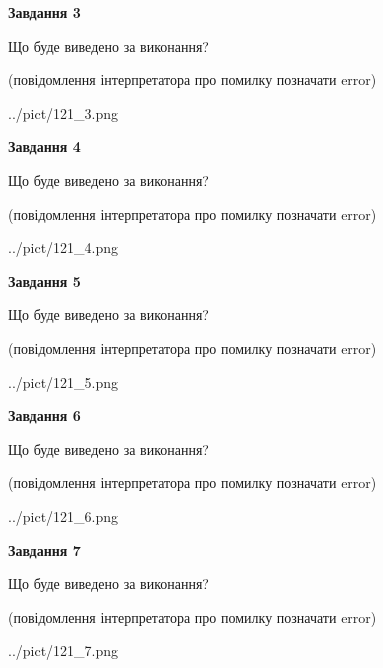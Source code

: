 \documentclass[12pt, ukrainian]{article}
\begin{document}
{\begin {large}
{\begin {center}\textbf{Завдання 3}\end {center}}\par
Що буде виведено за виконання?\par
 (повідомлення інтерпретатора про помилку позначати error)\par
\begin{center}
	{../pict/121_3.png}
\end{center}
\newpage

{\begin {center}\textbf{Завдання 4}\end {center}}\par
Що буде виведено за виконання?\par
 (повідомлення інтерпретатора про помилку позначати error)\par
\begin{center}
	{../pict/121_4.png}
\end{center}
\newpage

{\begin {center}\textbf{Завдання 5}\end {center}}\par
Що буде виведено за виконання?\par
 (повідомлення інтерпретатора про помилку позначати error)\par
\begin{center}
	{../pict/121_5.png}
\end{center}
\newpage

{\begin {center}\textbf{Завдання 6}\end {center}}\par
Що буде виведено за виконання?\par
 (повідомлення інтерпретатора про помилку позначати error)\par
\begin{center}
	{../pict/121_6.png}
\end{center}
\newpage

{\begin {center}\textbf{Завдання 7}\end {center}}\par
Що буде виведено за виконання?\par
 (повідомлення інтерпретатора про помилку позначати error)\par
\begin{center}
	{../pict/121_7.png}
\end{center}
\newpage


\end{large}}
\end{document}
